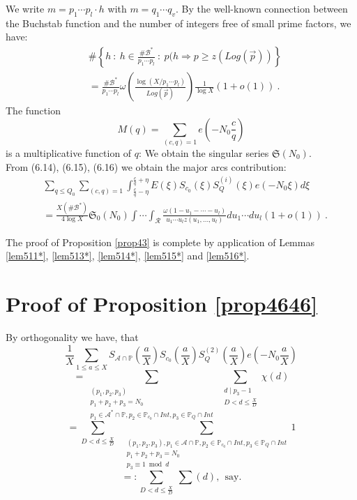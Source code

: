\documentclass{amsart}
\numberwithin{equation}{subsection}
\begin{document}
We write $m=p_1\cdots p_l\cdot h$ with $m=q_1\cdots q_v$. By the well-known connection between the Buchstab function and the number of integers free of small prime factors, we have:
\begin{align*}
&\#\left\{ h\::\: h\in \frac{\# \mathcal{B}^*}{p_1\cdots p_l}\::\: p(h\Rightarrow p\geq z(Log(\vec{p}))\right\} \tag{6.16}\\
&=\frac{\# \mathcal{B}^*}{p_1\cdots p_l} \omega\left( \frac{\log (X/p_1\cdots p_l)}{Log(\vec{p})}\right) \frac{1}{\log X} (1+o(1))\:.
\end{align*}
The function
$$M(q)=\sum_{(c, q)=1}e\left(-N_0\frac{c}{q}\right)$$
is a multiplicative function of $q$: We obtain the singular series $\mathfrak{S}(N_0)$.\\
From (6.14), (6.15), (6.16) we obtain the major arcs contribution:
\begin{align*}
&\sum_{q\leq Q_0} \sum_{(c, q)=1} \int_{\frac{c}{q}-\eta}^{\frac{c}{q}+\eta} E(\xi)S_{c_0}(\xi)S_{Q}^{(i)}(\xi) e(-N_0\xi)d\xi\\
&= \frac{X(\# \mathcal{B}^*)}{4\log X} \mathfrak{S}_0(N_0) \int\cdots\int_\mathcal{R} \frac{\omega(1-u_1-\cdots - u_l)}{u_1\cdots u_l z(u_1, \ldots, u_l)} du_1\cdots du_l (1+o(1))\:.
\end{align*}

The proof of Proposition \ref{prop43} is complete by application of Lemmas \ref{lem511*}, \ref{lem513*}, \ref{lem514*}, \ref{lem515*} and \ref{lem516*}.

%


\section{Proof of Proposition \ref{prop4646}}


By orthogonality we have, that 
\[
\frac{1}{X}\sum_{1\leq a\leq X} S_{\mathcal{A}\cap\mathbb{P}}\left(\frac{a}{X}\right) S_{c_0}\left(\frac{a}{X}\right) S_Q^{(2)}\left(\frac{a}{X}\right) e\left(-N_0\frac{a}{X}\right) \tag{7.1}
\]
$$=\sum_{\substack{(p_1, p_2, p_3) \\ p_1+p_2+p_3=N_0 \\ p_1\in \mathcal{A^*}\cap \mathbb{P}, p_2\in\mathbb{P}_{c_0}\cap Int, p_3\in \mathbb{P}_Q\cap Int}}\ \sum_{\substack{d\mid p_3-1\\ D<d\leq \frac{X}{D}}} \chi(d) $$
$$=\sum_{D<d\leq \frac{X}{D}}\ \ \ \sum_{\substack{(p_1, p_2, p_3), p_1\in \mathcal{A}\cap \mathbb{P}, p_2\in\mathbb{P}_{c_0}\cap Int, p_3\in\mathbb{P}_Q\cap Int \\ p_1+p_2+p_3=N_0 \\ p_3\equiv 1\bmod d}} 1$$
$$=:\sum_{D<d\leq \frac{X}{D}}\ \sum (d),\ \ \text{say}.$$
\end{document}
